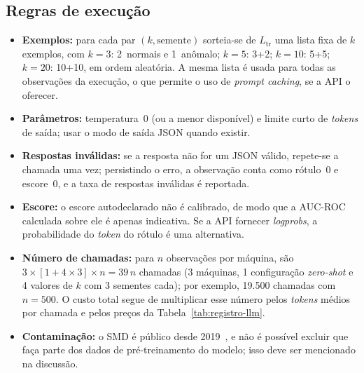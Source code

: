 \subsection{Regras de execução}
\begin{itemize}
  \item \textbf{Exemplos:} para cada par $(k,\text{semente})$ sorteia-se de $L_{\mathrm{tr}}$ uma lista fixa de $k$
        exemplos, com $k=3$: 2~normais e 1~anômalo; $k=5$: 3+2; $k=10$: 5+5; $k=20$: 10+10, em ordem
        aleatória. A mesma lista é usada para todas as observações da execução, o que permite o uso de
        \emph{prompt caching}, se a API o oferecer.
  \item \textbf{Parâmetros:} temperatura~0 (ou a menor disponível) e limite curto de \emph{tokens} de saída; usar o
        modo de saída JSON quando existir.
  \item \textbf{Respostas inválidas:} se a resposta não for um JSON válido, repete-se a chamada uma vez; persistindo
        o erro, a observação conta como rótulo~0 e escore~0, e a taxa de respostas inválidas é reportada.
  \item \textbf{Escore:} o escore autodeclarado não é calibrado, de modo que a AUC-ROC calculada sobre ele é
        apenas indicativa. Se a API fornecer \emph{logprobs}, a probabilidade do \emph{token} do rótulo é uma
        alternativa.
  \item \textbf{Número de chamadas:} para $n$ observações por máquina, são $3\times[1+4\times3]\times n=39\,n$
        chamadas (3 máquinas, 1 configuração \emph{zero-shot} e 4 valores de $k$ com 3 sementes cada); por
        exemplo, 19.500 chamadas com $n=500$. O custo total segue de multiplicar esse número pelos \emph{tokens}
        médios por chamada e pelos preços da Tabela~\ref{tab:registro-llm}.
  \item \textbf{Contaminação:} o SMD é público desde 2019~\cite{su2019,omnianomaly}, e não é possível excluir
        que faça parte dos dados de pré-treinamento do modelo; isso deve ser mencionado na discussão.
\end{itemize}

